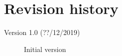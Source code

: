 \section{Revision history}
\begin{description}
    \item[Version 1.0 (??/12/2019)] Initial version 
\end{description}